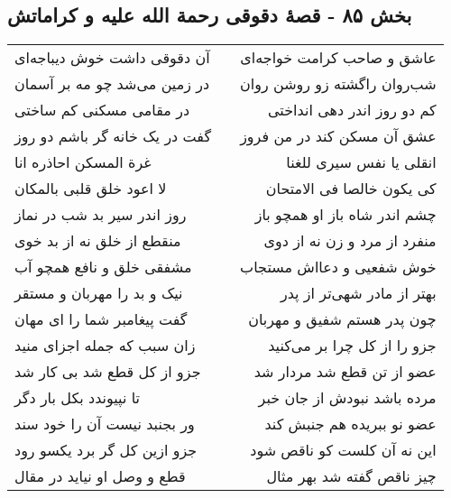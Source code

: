 \begin{center}
\section*{بخش ۸۵ - قصهٔ دقوقی رحمة الله علیه و کراماتش}
\label{sec:sh085}
\begin{longtable}{l p{0.5cm} r}
آن دقوقی داشت خوش دیباجه‌ای
&&
عاشق و صاحب کرامت خواجه‌ای
\\
در زمین می‌شد چو مه بر آسمان
&&
شب‌روان راگشته زو روشن روان
\\
در مقامی مسکنی کم ساختی
&&
کم دو روز اندر دهی انداختی
\\
گفت در یک خانه گر باشم دو روز
&&
عشق آن مسکن کند در من فروز
\\
غرة المسکن احاذره انا
&&
انقلی یا نفس سیری للغنا
\\
لا اعود خلق قلبی بالمکان
&&
کی یکون خالصا فی الامتحان
\\
روز اندر سیر بد شب در نماز
&&
چشم اندر شاه باز او همچو باز
\\
منقطع از خلق نه از بد خوی
&&
منفرد از مرد و زن نه از دوی
\\
مشفقی خلق و نافع همچو آب
&&
خوش شفعیی و دعااش مستجاب
\\
نیک و بد را مهربان و مستقر
&&
بهتر از مادر شهی‌تر از پدر
\\
گفت پیغامبر شما را ای مهان
&&
چون پدر هستم شفیق و مهربان
\\
زان سبب که جمله اجزای منید
&&
جزو را از کل چرا بر می‌کنید
\\
جزو از کل قطع شد بی کار شد
&&
عضو از تن قطع شد مردار شد
\\
تا نپیوندد بکل بار دگر
&&
مرده باشد نبودش از جان خبر
\\
ور بجنبد نیست آن را خود سند
&&
عضو نو ببریده هم جنبش کند
\\
جزو ازین کل گر برد یکسو رود
&&
این نه آن کلست کو ناقص شود
\\
قطع و وصل او نیاید در مقال
&&
چیز ناقص گفته شد بهر مثال
\\
\end{longtable}
\end{center}
